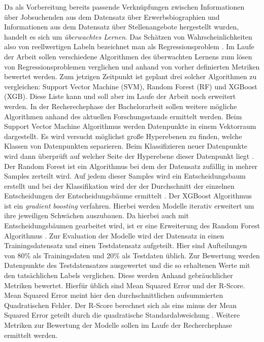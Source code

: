 \documentclass[
    11pt,
    a4paper,
    egregdoesnotlikesansseriftitles,
    toc=chapterentrywithdots,
    oneside,openright,
    titlepage,
    parskip=half,
    headings=normal,  %
    listof=totoc,
    bibliography=totoc,
    index=totoc,
    captions=tableheading,  %
    chapterprefix,
    listof=flat,
    final
]{scrbook}
\begin{document}
Da als Vorbereitung bereits passende Verknüpfungen zwischen Informationen über Jobsuchenden aus dem Datensatz über Erwerbsbiographien und Informationen aus dem Datensatz über Stellenangebote hergestellt wurden, handelt es sich um \textit{überwachtes Lernen}. Das Schätzen von Wahrscheinlichkeiten also von reellwertigen Labeln bezeichnet man als Regressionsproblem  \cite{mlfound}. Im Laufe der Arbeit sollen verschiedene Algorithmen des überwachten Lernens zum lösen von Regressionsproblemen verglichen und anhand von vorher definierten Metriken bewertet werden. Zum jetzigen Zeitpunkt ist geplant drei solcher Algorithmen zu vergleichen: Support Vector Machine (SVM), Random Forest (RF) und XGBoost (XGB). Diese Liste kann und soll aber im Laufe der Arbeit noch erweitert werden. In der Recherechephase der Bachelorarbeit sollen weitere mögliche Algorithmen anhand des aktuellen Forschungsstands ermittelt werden.
\newline
Beim Support Vector Machine Algorithmus werden Datenpunkte in einem Vektorraum dargestellt. Es wird versucht möglichst große Hyperebenen zu finden, welche Klassen von Datenpunkten separieren. Beim Klassifizieren neuer Datenpunkte wird dann überprüft auf welcher Seite der Hyperebene dieser Datenpunkt liegt \cite{svm}.
\newline
Der Random Forest ist ein Algorithmus bei dem der Datensatz zufällig in mehrer Samples zerteilt wird. Auf jedem dieser Samples wird ein Entscheidungsbaum erstellt und bei der Klassifikation wird der der Durchschnitt der einzelnen Entscheidungen der Entscheidungsbäume ermittelt \cite{rf}.
\newline
Der XGBoost Algorithmus ist ein \textit{gradient boosting} verfahren. Hierbei werden Modelle iterativ erweitert um ihre jeweiligen Schwächen auszubauen. Da hierbei auch mit Entscheidungsbäumen gearbeitet wird, ist er eine Erweiterung des Random Forest Algorithmus \cite{xgb}.
\newline
Zur Evaluation der Modelle wird der Datensatz in einen Trainingsdatensatz und einen Testdatensatz aufgeteilt. Hier sind Aufteilungen von 80\% als Trainingsdaten und 20\% als Testdaten üblich. Zur Bewertung werden Datenpunkte des Testdatensatzes ausgewertet und die so erhaltenen Werte mit den tatsächlichen Labels verglichen. Diese werden Anhand gebräuchlicher Metriken bewertet. Hierfür üblich sind Mean Squared Error und der R-Score. Mean Squared Error meint hier den durchschnittlichen aufsummierten Quadratischen Fehler. Der R-Score berechnet sich als eins minus der Mean Squared Error geteilt durch die quadratische Standardabweichung \cite{metrics}.  Weitere Metriken zur Bewertung der Modelle sollen im Laufe der Recherchephase ermittelt werden. 
\end{document}
